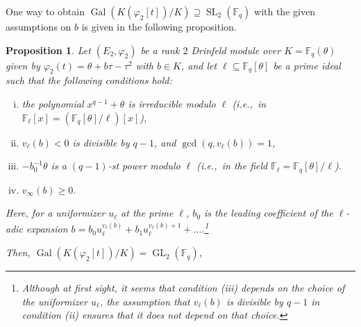 \documentclass[10pt,a4paper]{amsart}
\theoremstyle{plain} %
\newtheorem{Proposition}[Theorem]{Proposition}
\theoremstyle{definition}
\theoremstyle{remark}
\newcommand{\FF}{\mathbb{F}}
\newcommand{\Fq}{\FF_{\!q}}  %
\newcommand{\Gal}{\operatorname{Gal}}
\newcommand{\GL}{\operatorname{GL}}
\newcommand{\SL}{\operatorname{SL}}
\numberwithin{equation}{subsection}
\begin{document}
One way to obtain $\Gal(K(\varphi_2[t])/K)\supseteq \SL_2(\Fq)$ with the given assumptions on $b$ is given in the following proposition.

\begin{Proposition}
Let $(E_2, \varphi_2)$ be a rank $2$ Drinfeld module over  $K=\Fq(\theta)$ given by $\varphi_2(t)=\theta+b\tau-\tau^2$ with $b\in K$, and let $\ell\subseteq \Fq[\theta]$ be a prime ideal such that the following conditions hold:
\begin{enumerate}[(i)]
\item the polynomial $x^{q-1}+\theta$ is irreducible modulo $\ell$ (i.e.,~in $\FF_\ell[x]=(\Fq[\theta]/\ell)[x]$),
\item $v_\ell(b)<0$ is divisible by $q-1$, and $\operatorname{gcd}(q, v_\ell(b))=1$,
\item $-b_0^{-1}\theta$ is a $(q-1)$-st power modulo $\ell$ (i.e.,~in the field $\FF_\ell=\Fq[\theta]/\ell$).
\item $v_\infty(b)\geq 0$.
\end{enumerate}
Here, for a uniformizer $u_\ell$ at the prime $\ell$, $b_0$ is the leading coefficient of the $\ell$-adic expansion $b=b_0u_\ell^{v_\ell(b)}+b_1u_\ell^{v_\ell(b)+1}+\ldots$.\footnote{Although at first sight, it seems that condition (iii) depends on the choice of the uniformizer $u_\ell$, the assumption that $v_\ell(b)$ is divisible by $q-1$ in condition (ii) ensures that it does not depend on that choice.}

Then, $\Gal(K(\varphi_2[t])/K)=\GL_2(\Fq)$,
\end{Proposition}
\end{document}
